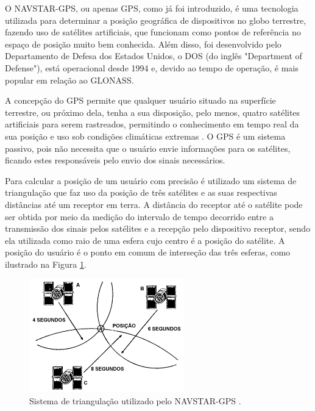 O NAVSTAR-GPS, ou apenas GPS, como já foi introduzido, é uma tecnologia utilizada para determinar a posição geográfica de dispositivos no globo terrestre, fazendo uso de satélites artificiais, que funcionam como pontos de referência no espaço de posição muito bem conhecida. Além disso, foi desenvolvido pelo Departamento de Defesa dos Estados Unidos, o DOS (do inglês "Department of Defense"), está operacional desde 1994 e, devido ao tempo de operação, é mais popular em relação ao GLONASS.

A concepção do GPS permite que qualquer usuário situado na superfície terrestre, ou próximo dela, tenha a sua disposição, pelo menos, quatro satélites artificiais para serem rastreados, permitindo o conhecimento em tempo real da sua posição e uso sob condições climáticas extremas \cite{miguens1996navegaccao}. O GPS é um sistema passivo, pois não necessita que o usuário envie informações para os satélites, ficando estes responsáveis pelo envio dos sinais necessários.

Para calcular a posição de um usuário com precisão é utilizado um sistema de triangulação que faz uso da posição de três satélites e as suas respectivas distâncias até um receptor em terra. A distância do receptor até o satélite pode ser obtida por meio da medição do intervalo de tempo decorrido entre a transmissão dos sinais pelos satélites e a recepção pelo dispositivo receptor, sendo ela utilizada como raio de uma esfera cujo centro é a posição do satélite. A posição do usuário é o ponto em comum de interseção das três esferas, como ilustrado na Figura \ref{triangulacao_gps}.

\begin{figure}[htp!]
\centering
\includegraphics[width=0.60\textwidth]{figuras/cap_2/secao_3/triangulacao_gps.png}
\caption{Sistema de triangulação utilizado pelo NAVSTAR-GPS \cite{miguens1996navegaccao}.}
\label{triangulacao_gps}
\end{figure}

